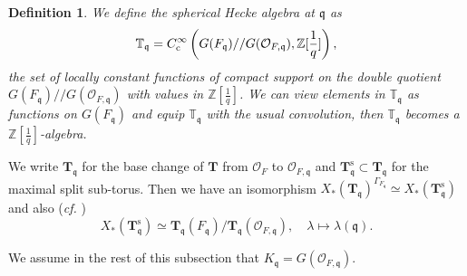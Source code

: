 \documentclass[12pt,oneside,reqno]{amsart}
\theoremstyle{plain}
\newtheorem{definition}[theorem]{Definition}
\begin{document}
	
	
	
	\begin{definition}\label{spherical Hecke algebra}
		We define the
		spherical Hecke algebra at $\mathfrak{q}$
		as
		\[
		\mathbb{T}_\mathfrak{q}
		=
		C_\mathrm{c}^\infty
		\left(
		G(F_\mathfrak{q})
		//
		G(\mathcal{O}_{F,\mathfrak{q}}),
		\mathbb{Z}[\frac{1}{q}]
		\right),\index{T@$\mathbb{T}_\mathfrak{q}$}
		\]
		the set of locally constant functions of compact support on
		the double quotient
		$G(F_\mathfrak{q})//G(\mathcal{O}_{F,\mathfrak{q}})$
		with values in
		$\mathbb{Z}[\frac{1}{q}]$.
		We can view elements in $\mathbb{T}_{\mathfrak{q}}$
		as functions on
		$G(F_\mathfrak{q})$
		and
		equip $\mathbb{T}_{\mathfrak{q}}$ with the usual convolution, then $\mathbb{T}_{\mathfrak{q}}$
		becomes a
		$\mathbb{Z}[\frac{1}{q}]$-algebra.
	\end{definition}
	
	
	
	We write
	$\mathbf{T}_\mathfrak{q}$
	for the base change of $\mathbf{T}$ from
	$\mathcal{O}_F$ to
	$\mathcal{O}_{F,\mathfrak{q}}$
	and
	$\mathbf{T}_\mathfrak{q}^\mathrm{s}
	\subset
	\mathbf{T}_\mathfrak{q}$
	for the maximal split sub-torus.
	Then we have an isomorphism
	$X_\ast(\mathbf{T}_\mathfrak{q})^{\Gamma_{F_\mathfrak{q}}}
	\simeq
	X_\ast(\mathbf{T}_\mathfrak{q}^\mathrm{s})$
	and also
	(\emph{cf.}
	\cite[(16.5)]{Gross1999})
	\[
	X_\ast(\mathbf{T}_\mathfrak{q}^\mathrm{s})
	\simeq
	\mathbf{T}_\mathfrak{q}(F_\mathfrak{q})/
	\mathbf{T}_\mathfrak{q}(\mathcal{O}_{F,\mathfrak{q}}),
	\quad
	\lambda
	\mapsto
	\lambda(\mathfrak{q}).
	\]	  
	
	We assume in the rest of this subsection that
	$K_{\mathfrak{q}}=G(\mathcal{O}_{F,\mathfrak{q}})$.
	
\end{document}
